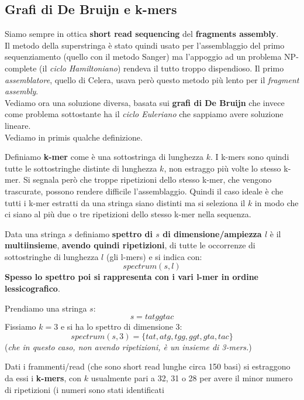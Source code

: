 \documentclass[a4paper,12pt, oneside]{book}
\begin{document}
\subsection{Grafi di De Bruijn e k-mers}
Siamo sempre in ottica \textbf{short read sequencing} del \textbf{fragments
  assembly}.\\ 
Il metodo della superstringa è stato quindi usato per l'assemblaggio del primo
sequenziamento (quello con il metodo Sanger) ma l'appoggio ad un problema
NP-complete (il \textit{ciclo Hamiltoniano}) rendeva il tutto troppo
dispendioso. Il primo \textit{assemblatore}, quello di Celera, usava però questo
metodo più lento per il \textit{fragment assembly}.\\
Vediamo ora una soluzione diversa, basata sui \textbf{grafi di De Bruijn} che
invece come problema sottostante ha il \textit{ciclo Euleriano} che sappiamo
avere soluzione lineare. \\
Vediamo in primis qualche definizione.
\begin{definizione}
  Definiamo \textbf{k-mer} come è una sottostringa di lunghezza
  $k$. I k-mers sono quindi tutte le sottostringhe distinte di lunghezza $k$,
  non estraggo più volte lo stesso k-mer. Si segnala però che troppe
  ripetizioni dello stesso k-mer, che vengono trascurate, possono rendere
  difficile l'assemblaggio. Quindi il caso ideale è che tutti i k-mer estratti
  da una stringa siano distinti ma si seleziona il $k$ in modo che ci siano al
  più due o tre ripetizioni dello stesso k-mer nella sequenza.
\end{definizione}
\begin{definizione}
  Data una stringa $s$ definiamo \textbf{spettro di $s$ di dimensione/ampiezza
    $l$} è il 
  \textbf{multiinsieme}, \textbf{avendo quindi ripetizioni}, di tutte le
  occorrenze di sottostringhe di lunghezza $l$ (gli l-mers) e si indica con:
  \[spectrum(s,l)\]
  \textbf{Spesso lo spettro poi si rappresenta con i vari l-mer in ordine
    lessicografico}. 
\end{definizione}
\begin{esempio}
  Prendiamo una stringa $s$:
  \[s=tatggtac\]
  Fissiamo $k=3$ e si ha lo spettro di dimensione $3$:
  \[spectrum(s,3)=\{tat, atg, tgg, ggt, gta, tac\}\]
  (\textit{che in questo caso, non avendo ripetizioni, è un insieme di 3-mers.})
\end{esempio}
Dati i frammenti/read (che sono short read lunghe circa 150 basi) si estraggono
da essi i \textbf{k-mers}, con $k$ usualmente pari a 32, 31 o 28 per avere il
minor numero di ripetizioni (i numeri sono stati identificati
\end{document}
